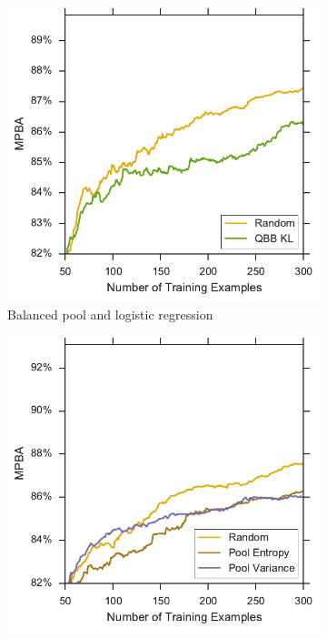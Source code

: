 \begin{figure}[p]
	\centering
	\begin{subfigure}{.5\textwidth}
		\centering
		\includegraphics[width=\textwidth]{figures/5_active/sdss_bl_ind_lower}
		\caption{Balanced pool and logistic regression}
		\label{fig:sdss_bl_ind_lower}
	\end{subfigure}%
	\begin{subfigure}{.5\textwidth}
		\centering
		\includegraphics[width=\linewidth]{figures/5_active/sdss_br_ind_lower}

\end{subfigure}
\end{figure}
